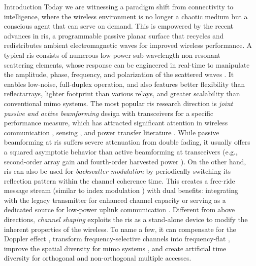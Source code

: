 \documentclass[journal]{IEEEtran}
\begin{document}
\begin{section}{Introduction}
	Today we are witnessing a paradigm shift from connectivity to intelligence, where the wireless environment is no longer a chaotic medium but a conscious agent that can serve on demand.
	This is empowered by the recent advances in \gls{ris}, a programmable passive planar surface that recycles and redistributes ambient electromagnetic waves for improved wireless performance.
	A typical \gls{ris} consists of numerous low-power sub-wavelength non-resonant scattering elements, whose response can be engineered in real-time to manipulate the amplitude, phase, frequency, and polarization of the scattered waves \cite{Basar2019}.
	It enables low-noise, full-duplex operation, and also features better flexibility than reflectarrays, lighter footprint than various relays, and greater scalability than conventional \gls{mimo} systems.
	The most popular \gls{ris} research direction is \emph{joint passive and active beamforming} design with transceivers for a specific performance measure, which has attracted significant attention in wireless communication \cite{Wu2019,Guo2020,Liu2022}, sensing \cite{He2022,Luo2022,Hua2023}, and power transfer literature \cite{Wu2020a,Feng2022,Zhao2022}.
	While passive beamforming at \gls{ris} suffers severe attenuation from double fading, it usually offers a squared asymptotic behavior than active beamforming at transceivers (e.g., second-order array gain and fourth-order harvested power \cite{Zhao2022}).
	On the other hand, \gls{ris} can also be used for \emph{backscatter modulation} by periodically switching its reflection pattern within the channel coherence time.
	This creates a free-ride message stream (similar to index modulation \cite{Basar2017}) with dual benefits: integrating with the legacy transmitter for enhanced channel capacity \cite{Karasik2020,Basar2020,Ye2022} or serving as a dedicated source for low-power uplink communication \cite{Liang2020,Zhao2024,Yang2024}.
	Different from above directions, \emph{channel shaping} exploits the \gls{ris} as a stand-alone device to modify the inherent properties of the wireless.
	To name a few, it can compensate for the Doppler effect \cite{Basar2021}, transform frequency-selective channels into frequency-flat \cite{Arslan2022}, improve the spatial diversity for \gls{mimo} systems \cite{Ozdogan2020a}, and create artificial time diversity for orthogonal \cite{Yang2019} and non-orthogonal \cite{Chen2023} multiple accesses.

\end{section}
\end{document}
